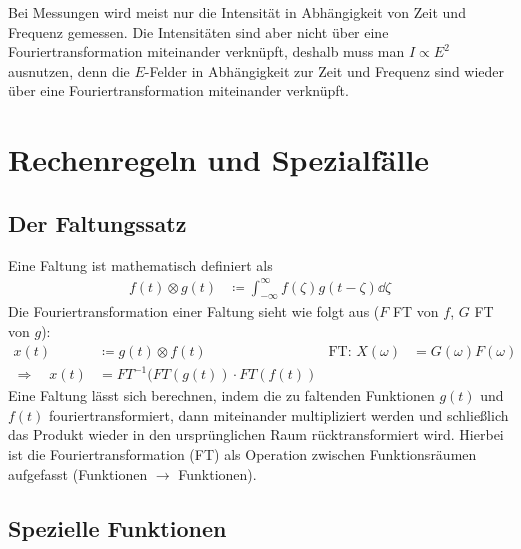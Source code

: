 Bei Messungen wird meist nur die Intensität in
Abhängigkeit von Zeit und Frequenz gemessen. Die Intensitäten sind
aber nicht über eine Fouriertransformation miteinander verknüpft,
deshalb muss man $I\propto E^2$ ausnutzen, denn die $E$-Felder in
Abhängigkeit zur Zeit und Frequenz sind wieder über eine
Fouriertransformation miteinander verknüpft.


\section{Rechenregeln und Spezialfälle}
\subsection{Der Faltungssatz}
Eine Faltung ist mathematisch definiert als 
\begin{align*}
  f(t)\otimes g(t)
  &\coloneqq \int_{-\infty}^{\infty} f(\zeta)g(t-\zeta)\dd\zeta
\end{align*}
Die Fouriertransformation einer Faltung sieht wie folgt aus ($F$ FT
von $f$, $G$ FT von $g$):
\begin{align*}
  x(t) &\coloneqq g(t)\otimes f(t)
  &\text{FT: } X(\omega) &= G(\omega)F(\omega)\\
  \Rightarrow\quad 
  x(t) &= FT^{-1}(FT(g(t))\cdot FT(f(t))
\end{align*}
Eine Faltung lässt sich berechnen, indem die zu faltenden Funktionen
$g(t)$ und $f(t)$ fouriertransformiert, dann miteinander
multipliziert werden und schließlich das Produkt wieder in den
ursprünglichen Raum rücktransformiert wird.
Hierbei ist die Fouriertransformation (FT) als Operation zwischen
Funktionsräumen aufgefasst (Funktionen $\to$ Funktionen).


\subsection{Spezielle Funktionen}
